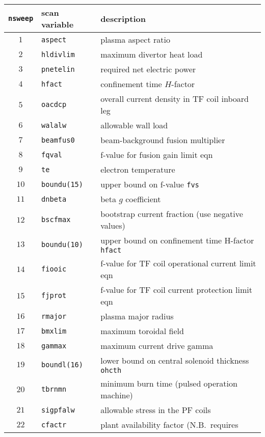 \documentclass[11pt,a4paper]{report}
\begin{document}
\begin{table}[tbph]
\begin{center}

\begin{tabular}{||c|l|l||} \hline
\texttt{nsweep} & scan variable & description \\ \hline
$1 $ & \texttt{aspect}     & plasma aspect ratio \\
$2 $ & \texttt{hldivlim}   & maximum divertor heat load \\
$3 $ & \texttt{pnetelin}   & required net electric power \\
$4 $ & \texttt{hfact}      & confinement time $H$-factor \\
$5 $ & \texttt{oacdcp}     & overall current density in TF coil inboard leg \\
$6 $ & \texttt{walalw}     & allowable wall load \\
$7 $ & \texttt{beamfus0}   & beam-background fusion multiplier \\
$8 $ & \texttt{fqval}      & f-value for fusion gain limit eqn \\
$9 $ & \texttt{te}         & electron temperature \\
$10$ & \texttt{boundu(15)} & upper bound on f-value \texttt{fvs} \\
$11$ & \texttt{dnbeta}     & beta $g$ coefficient \\
$12$ & \texttt{bscfmax}    & bootstrap current fraction (use negative values) \\
$13$ & \texttt{boundu(10)} & upper bound on confinement time H-factor \texttt{hfact}\\
$14$ & \texttt{fiooic}     & f-value for TF coil operational current limit eqn \\
$15$ & \texttt{fjprot}     & f-value for TF coil current protection limit eqn \\
$16$ & \texttt{rmajor}     & plasma major radius \\
$17$ & \texttt{bmxlim}     & maximum toroidal field \\
$18$ & \texttt{gammax}     & maximum current drive gamma \\
$19$ & \texttt{boundl(16)} & lower bound on central solenoid thickness \texttt{ohcth} \\
$20$ & \texttt{tbrnmn}     & minimum burn time (pulsed operation machine) \\
$21$ & \texttt{sigpfalw}   & allowable stress in the PF coils \\
$22$ & \texttt{cfactr}     & plant availability factor (N.B.\ requires

\end{tabular}
\end{center}
\end{table}
\end{document}
